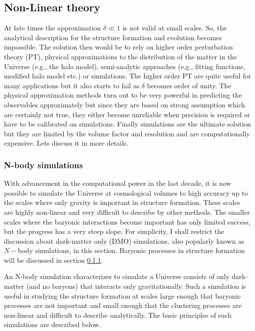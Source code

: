 \subsection{Non-Linear theory}

At late times the approximation $\delta \ll 1$ is not valid at small scales. So, the analytical
description for the structure formation and evolution becomes impossible. The solution then would 
be to rely on higher order perturbation theory (PT), physical approximations to the
distribution of the matter in the Universe (e.g., the halo model), 
semi-analytic approaches (e.g., fitting functions, modified halo model etc.) or simulations. 
The higher order PT are quite useful for many applications but it also starts to 
fail as $\delta$ becomes order of unity. The physical approximation methods turn 
out to be very powerful in predicting the observables approximately 
but since they are based on strong assumption which are 
certainly not true, they either become unreliable when precision is required or have
to be calibrated on simulations. Finally simulations are the ultimate solution but they
are limited by the volume factor and resolution and are computationally expensive. 
Lets discuss it in more details. 

\subsubsection{N-body simulations}

With advancement in the computational power in the last decade, it is now possible to
simulate the Universe at cosmological volumes to high accuracy up to the scales where
only gravity is important in structure formation. These scales are highly non-linear and
very difficult to describe by other methods. The smaller scales where the baryonic
interactions become important has only limited success, but the progress has a very
steep slope. For simplicity, I shall restrict the discussion about dark-matter only (DMO)
simulations, also popularly known as $N-$body simulations,
in this section. Baryonic processes in structure formation will be discussed in section \ref{}.

An N-body simulation
characterizes to simulate a Universe consists of only dark-matter (and no baryons) that 
interacts only gravitationally. Such a simulation is useful in studying the
structure formation at scales large enough that baryonic processes are not 
important and small enough that the clustering processes are non-linear and difficult
to describe analytically. The basic principles of such simulations are described below.

